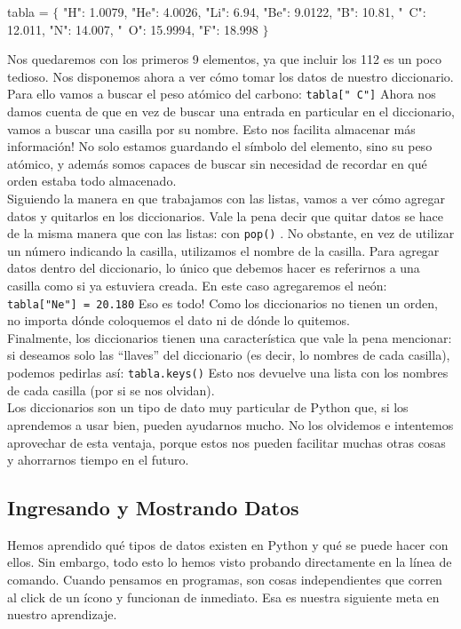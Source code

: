 \documentclass[10pt,letterpaper]{article}
\newcommand{\inlinecode}[1]{
\colorbox{light-gray}{\texttt{#1}}
}
\newenvironment{Code}
{
\begin{lrbox}{\selvestebox}%
\begin{minipage}{\dimexpr\columnwidth-2\fboxsep\relax}
\fontfamily{\ttdefault}\selectfont
}
{\end{minipage}\end{lrbox}%
\begin{center}
\colorbox{light-gray}{\usebox{\selvestebox}}
\end{center}
}
\begin{document}
\begin{Code}
tabla = $\lbrace$ "H": 1.0079, "He": 4.0026, "Li": 6.94, "Be": 9.0122, "B": 10.81, "\ \hspace{-2mm}C": 12.011, "N": 14.007, "\ \hspace{-2mm}O": 15.9994, "F": 18.998 $\rbrace$
\end{Code}

Nos quedaremos con los primeros 9 elementos, ya que incluir los 112 es un poco tedioso. Nos disponemos ahora a ver c\'omo tomar los datos de nuestro diccionario. Para ello vamos a buscar el peso at\'omico del carbono: \inlinecode{tabla["\ \hspace{-2mm}C"]} Ahora nos damos cuenta de que en vez de buscar una entrada en particular en el diccionario, vamos a buscar una casilla por su nombre. Esto nos facilita almacenar m\'as informaci\'on! No solo estamos guardando el s\'imbolo del elemento, sino su peso at\'omico, y adem\'as somos capaces de buscar sin necesidad de recordar en qu\'e orden estaba todo almacenado.\\

Siguiendo la manera en que trabajamos con las listas, vamos a ver c\'omo agregar datos y quitarlos en los diccionarios. Vale la pena decir que quitar datos se hace de la misma manera que con las listas: con \inlinecode{pop()}. No obstante, en vez de utilizar un n\'umero indicando la casilla, utilizamos el nombre de la casilla. Para agregar datos dentro del diccionario, lo \'unico que debemos hacer es referirnos a una casilla como si ya estuviera creada. En este caso agregaremos el ne\'on: \inlinecode{tabla["Ne"] = 20.180} Eso es todo! Como los diccionarios no tienen un orden, no importa d\'onde coloquemos el dato ni de d\'onde lo quitemos.\\

Finalmente, los diccionarios tienen una caracter\'istica que vale la pena mencionar: si deseamos solo las ``llaves'' del diccionario (es decir, lo nombres de cada casilla), podemos pedirlas as\'i: \inlinecode{tabla.keys()} Esto nos devuelve una lista con los nombres de cada casilla (por si se nos olvidan).\\

Los diccionarios son un tipo de dato muy particular de Python que, si los aprendemos a usar bien, pueden ayudarnos mucho. No los olvidemos e intentemos aprovechar de esta ventaja, porque estos nos pueden facilitar muchas otras cosas y ahorrarnos tiempo en el futuro.

\subsection{Ingresando y Mostrando Datos}
Hemos aprendido qu\'e tipos de datos existen en Python y qu\'e se puede hacer con ellos. Sin embargo, todo esto lo hemos visto probando directamente en la l\'inea de comando. Cuando pensamos en programas, son cosas independientes que corren al click de un \'icono y funcionan de inmediato. Esa es nuestra siguiente meta en nuestro aprendizaje.\\
\end{document}
